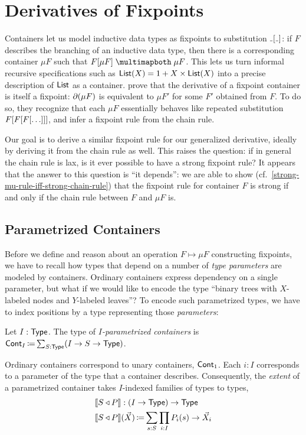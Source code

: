 \section{Derivatives of Fixpoints}\label{fixed-points}

Containers let us model inductive data types as fixpoints to substitution \( \Subst{\Blank}{\Blank} \):
if \( F \) describes the branching of an inductive data type, then there is a corresponding
container \( \mu F \) such that \( \CartIso{\Subst{F}{\mu F}}{\mu F} \).
This lets us turn informal recursive specifications such as \( \mathsf{List}(X) = 1 + X \times \mathsf{List}(X) \)
into a precise description of \( \mathsf{List} \) as a container.
 prove that the derivative of a fixpoint container
is itself a fixpoint: \( \partial{(\mu F)} \) is equivalent to \( \mu F' \) for some \( F' \) obtained from \( F \).
To do so, they recognize that each \( \mu F \) essentially behaves like repeated substitution \( F\lbrack F\lbrack F\lbrack\ldots\rbrack\rbrack\rbrack \),
and infer a fixpoint rule from the chain rule.

Our goal is to derive a similar fixpoint rule for our generalized derivative,
ideally by deriving it from the chain rule as well.
This raises the question: if in general the chain rule is lax,
is it ever possible to have a strong fixpoint rule?
It appears that the answer to this question is \enquote{it depends}:
we are able to show (cf.~\autoref{strong-mu-rule-iff-strong-chain-rule})
that the fixpoint rule for container \( F \) is strong if and only if the chain rule
between \( F \) and \( \mu F \) is.

\subsection{Parametrized Containers}

Before we define and reason about an operation \( F \mapsto \mu F \) constructing fixpoints,
we have to recall how types that depend on a number of \emph{type parameters} are modeled by containers.
Ordinary containers express dependency on a single parameter,
but what if we would like to encode the type \enquote{binary trees with \( X \)-labeled nodes and \( Y \)-labeled leaves}?
To encode such parametrized types, we have to index positions by a type representing those \emph{parameters}:
\begin{definition}[note={Parametrized containers}]
  Let \( I : \operatorname{\mathsf{Type}} \). The type of \emph{\( I \)-parametrized containers} is
  \(
    \operatorname{\mathsf{Cont}}_{I} \operatorname{\mathrel{\coloneq}} \sum_{S : \operatorname{\mathsf{Type}}} (I \to S \to \operatorname{\mathsf{Type}})
  \).
\end{definition}
Ordinary containers correspond to unary containers, \( \operatorname{\mathsf{Cont}}_{1} \).
Each \( i : I \) corresponds to a parameter of the type that a container describes.
Consequently, the \emph{extent} of a parametrized container takes \( I \)-indexed families of types to types,
\begin{align*}
  &\llbracket S\mathbin{\triangleleft}P\rrbracket : (I \to \operatorname{\mathsf{Type}}) \to \operatorname{\mathsf{Type}} \\
  &\llbracket S\mathbin{\triangleleft}P\rrbracket(\vec{X}) \operatorname{\mathrel{\coloneq}} \sum_{s : S} \prod_{i : I} P_i(s) \to \vec{X}_i
\end{align*}

